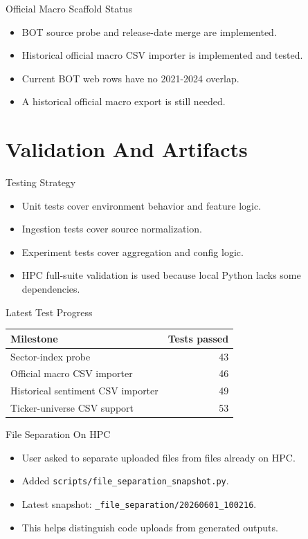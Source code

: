 \documentclass[aspectratio=43,10pt]{beamer}
\begin{document}
\begin{frame}{Official Macro Scaffold Status}
\begin{itemize}
  \item BOT source probe and release-date merge are implemented.
  \item Historical official macro CSV importer is implemented and tested.
  \item Current BOT web rows have no 2021-2024 overlap.
  \item A historical official macro export is still needed.
\end{itemize}
\end{frame}



\section{Validation And Artifacts}

\begin{frame}{Testing Strategy}
\begin{itemize}
  \item Unit tests cover environment behavior and feature logic.
  \item Ingestion tests cover source normalization.
  \item Experiment tests cover aggregation and config logic.
  \item HPC full-suite validation is used because local Python lacks some dependencies.
\end{itemize}
\end{frame}

\begin{frame}{Latest Test Progress}
\begin{center}
\begin{tabular}{lr}
\toprule
Milestone & Tests passed \\
\midrule
Sector-index probe & 43 \\
Official macro CSV importer & 46 \\
Historical sentiment CSV importer & 49 \\
Ticker-universe CSV support & 53 \\
\bottomrule
\end{tabular}
\end{center}
\end{frame}

\begin{frame}{File Separation On HPC}
\begin{itemize}
  \item User asked to separate uploaded files from files already on HPC.
  \item Added \texttt{scripts/file\_separation\_snapshot.py}.
  \item Latest snapshot: \texttt{\_file\_separation/20260601\_100216}.
  \item This helps distinguish code uploads from generated outputs.
\end{itemize}
\end{frame}
\end{document}
